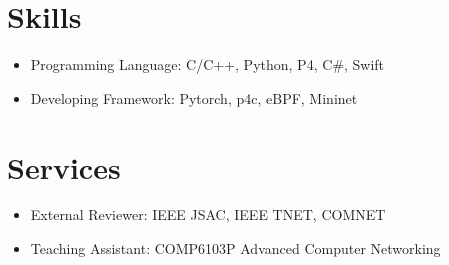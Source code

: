 \documentclass{resume}
\begin{document}
\section{Skills}

\begin{itemize}[parsep=0.5ex]
  \item Programming Language: C/C++, Python, P4, C\#, Swift
  \item Developing Framework: Pytorch, p4c, eBPF, Mininet
\end{itemize}

\section{Services}

\begin{itemize}[parsep=0.5ex]
  \item External Reviewer: IEEE JSAC, IEEE TNET, COMNET
  \item Teaching Assistant: COMP6103P Advanced Computer Networking
\end{itemize}
\end{document}
